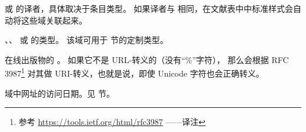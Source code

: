 \begin{fieldlist}



 或  的译者，具体取决于条目类型。
如果译者与  相同，在文献表中中标准样式会自动将这些域关联起来。




、、 或  的类型。
该域可用于  节的定制类型。




在线出版物的 。
如果它不是 URL-转义的（没有“\%”字符），
那么会根据 RFC 3987\footnote{参考 \url{https://tools.ietf.org/html/rfc3987} ——译注}
对其做 URI-转义，也就是说，即使 Unicode 字符也会正确转义。




 域中网址的访问日期。见  节。




\end{fieldlist}
